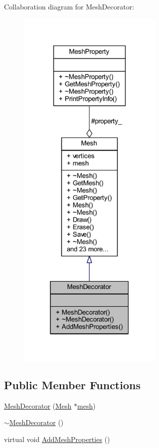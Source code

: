 Collaboration diagram for Mesh\+Decorator\+:
\nopagebreak
\begin{figure}[H]
\begin{center}
\leavevmode
\includegraphics[width=197pt]{class_mesh_decorator__coll__graph}
\end{center}
\end{figure}
\subsection*{Public Member Functions}
\begin{DoxyCompactItemize}
\item 
\mbox{\hyperlink{class_mesh_decorator_ae3ceb94226ae186d6afc43e92a8befaf}{Mesh\+Decorator}} (\mbox{\hyperlink{class_mesh}{Mesh}} $\ast$\mbox{\hyperlink{class_mesh_a5878a5aeed5faa444201d58f57ef394a}{mesh}})
\item 
\mbox{\hyperlink{class_mesh_decorator_a8588a37fe17a02637652f6dbeb92426b}{$\sim$\+Mesh\+Decorator}} ()
\item 
virtual void \mbox{\hyperlink{class_mesh_decorator_a8afe0a2ff59d5c10e8b48b2307c05e53}{Add\+Mesh\+Properties}} ()
\end{DoxyCompactItemize}

